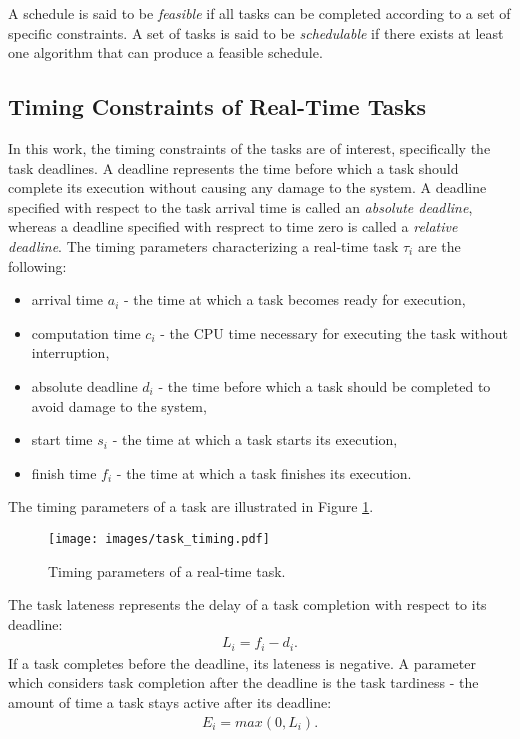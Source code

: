 A schedule is said to be \textit{feasible} if all tasks can be completed according to a set of specific constraints.
A set of tasks is said to be \textit{schedulable} if there exists at least one algorithm that can produce a feasible schedule.

\subsection{Timing Constraints of Real-Time Tasks}
In this work, the timing constraints of the tasks are of interest, specifically the task deadlines.
A deadline represents the time before which a task should complete its execution without causing any damage to the system.
A deadline specified with respect to the task arrival time is called an \textit{absolute deadline}, whereas a deadline specified with resprect to time zero is called a \textit{relative deadline}.
The timing parameters characterizing a real-time task $\tau_i$ are the following:
\begin{itemize}
    \item arrival time $a_i$ - the time at which a task becomes ready for execution,
    \item computation time $c_i$ - the CPU time necessary for executing the task without interruption,
    \item absolute deadline $d_i$ - the time before which a task should be completed to avoid damage to the system,
    \item start time $s_i$ - the time at which a task starts its execution,
    \item finish time $f_i$ - the time at which a task finishes its execution.
\end{itemize}
The timing parameters of a task are illustrated in Figure \ref{task_timing}.
\begin{figure}[ht]
    \centering
    \texttt{[image: images/task\_timing.pdf]}
    \caption{Timing parameters of a real-time task.}
    \label{task_timing}
\end{figure}
The task lateness represents the delay of a task completion with respect to its deadline:
\begin{align*}
L_i = f_i - d_i.
\end{align*}
If a task completes before the deadline, its lateness is negative.
A parameter which considers task completion after the deadline is the task tardiness - the amount of time a task stays active after its deadline:
\begin{align*}
E_i = max( 0, L_i ).
\end{align*}

